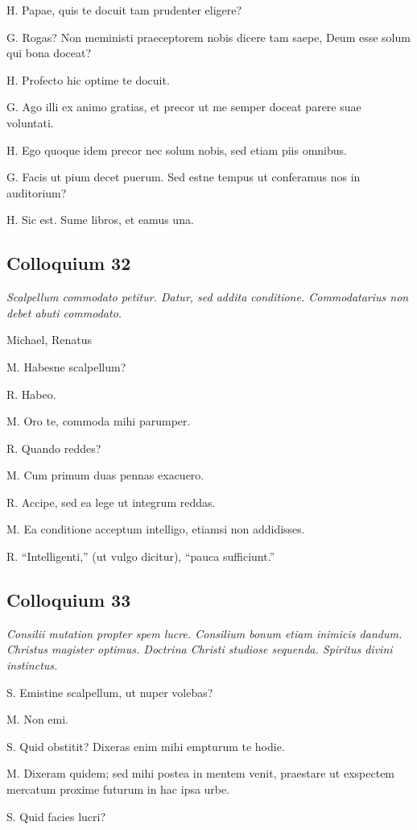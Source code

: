 \documentclass{article}
\begin{document}
H. Papae, quis te docuit tam prudenter eligere?

G. Rogas? Non meministi praeceptorem nobis dicere tam saepe, Deum esse solum qui bona doceat?

H. Profecto hic optime te docuit.

G. Ago illi ex animo gratias, et precor ut me semper doceat parere suae voluntati.

H. Ego quoque idem precor nec solum nobis, sed etiam piis omnibus.

G. Facis ut pium decet puerum. Sed estne tempus ut conferamus nos in auditorium?

H. Sic est. Sume libros, et eamus una.

\subsection{Colloquium 32}
\emph{Scalpellum commodato petitur. Datur, sed addita conditione. Commodatarius non debet abuti commodato.}

Michael, Renatus

M. Habesne scalpellum?

R. Habeo.

M. Oro te, commoda mihi parumper.

R. Quando reddes?

M. Cum primum duas pennas exacuero.

R. Accipe, sed ea lege ut integrum reddas.

M. Ea conditione acceptum intelligo, etiamsi non addidisses.

R. ``Intelligenti,'' (ut vulgo dicitur), ``pauca sufficiunt.''

\subsection{Colloquium 33}
\emph{Consilii mutation propter spem lucre. Consilium bonum etiam inimicis dandum. Christus magister optimus. Doctrina Christi studiose sequenda. Spiritus divini instinctus.}

S. Emistine scalpellum, ut nuper volebas?

M. Non emi.

S. Quid obstitit? Dixeras enim mihi empturum te hodie.

M. Dixeram quidem; sed mihi postea in mentem venit, praestare ut exspectem mercatum proxime futurum in hac ipsa urbe.

S. Quid facies lucri?
\end{document}

